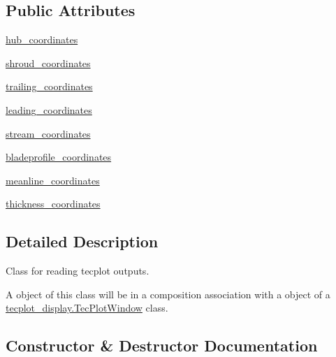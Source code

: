 \subsection*{Public Attributes}
\begin{DoxyCompactItemize}
\item 
\hyperlink{classtecplot__modules_1_1tecplot__reader_1_1_tec_plot_core_a2ccc38e7f7503e06d5c5fad58a071f80}{hub\+\_\+coordinates}
\item 
\hyperlink{classtecplot__modules_1_1tecplot__reader_1_1_tec_plot_core_a583d4851d722f76e18ec7841357b4ea7}{shroud\+\_\+coordinates}
\item 
\hyperlink{classtecplot__modules_1_1tecplot__reader_1_1_tec_plot_core_ab6edfe4cfa33db98eb1414228f78a303}{trailing\+\_\+coordinates}
\item 
\hyperlink{classtecplot__modules_1_1tecplot__reader_1_1_tec_plot_core_af991756a166df02da0a122d8d7c5c372}{leading\+\_\+coordinates}
\item 
\hyperlink{classtecplot__modules_1_1tecplot__reader_1_1_tec_plot_core_a4c8e60241684e96d45eabfb99e6955fd}{stream\+\_\+coordinates}
\item 
\hyperlink{classtecplot__modules_1_1tecplot__reader_1_1_tec_plot_core_abd9898f018cbb1686522d50721f851a7}{bladeprofile\+\_\+coordinates}
\item 
\hyperlink{classtecplot__modules_1_1tecplot__reader_1_1_tec_plot_core_a33fc4c19a7badee5e2a88f3be97f8efb}{meanline\+\_\+coordinates}
\item 
\hyperlink{classtecplot__modules_1_1tecplot__reader_1_1_tec_plot_core_a894f4ab5042e885fa8349c50c37059ac}{thickness\+\_\+coordinates}
\end{DoxyCompactItemize}


\subsection{Detailed Description}
Class for reading tecplot outputs. 

A object of this class will be in a composition association with a object of a \hyperlink{classtecplot__modules_1_1tecplot__display_1_1_tec_plot_window}{tecplot\+\_\+display.\+Tec\+Plot\+Window} class. 

\subsection{Constructor \& Destructor Documentation}
\hypertarget{classtecplot__modules_1_1tecplot__reader_1_1_tec_plot_core_a15954180c0b4a9677efd980873a91773}{}\label{classtecplot__modules_1_1tecplot__reader_1_1_tec_plot_core_a15954180c0b4a9677efd980873a91773} 
